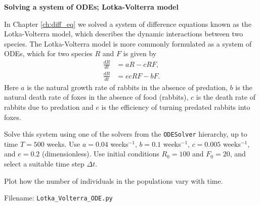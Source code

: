 \begin{Problem}{\textbf{Solving a system of ODEs; Lotka-Volterra model}}


  In Chapter \ref{ch:diff_eq} we solved a system of difference equations known
  as the Lotka-Volterra model, which describes the dynamic interactions between two
  species. The Lotka-Volterra model is more commonly formulated as a system of ODEs,
  which for two species $R$ and $F$ is given by
  \begin{align*}
  \frac{dR}{dt} &= aR - cRF, \\
  \frac{dR}{dt} &= ecRF - bF.
  \end{align*}
  Here $a$ is the natural growth rate of rabbits in the absence of predation, $b$ is
  the natural death rate of foxes in the absence of food (rabbits), $c$ is the death
  rate of rabbits due to predation and $e$ is the efficiency of turning
  predated rabbits into foxes.

  Solve this system using one of the solvers from the \texttt{ODESolver} hierarchy,
  up to time $T=500$ weeks. Use $a = 0.04$ weeks$^{-1}$, $b = 0.1$ weeks$^{-1}$,
  $c = 0.005$ weeks$^{-1}$, and $e = 0.2$ (dimensionless). Use initial conditions
  $R_0 = 100$ and $F_0 = 20$, and select a suitable time step $\Delta t$.

  Plot how the number of individuals in the populations
  vary with time.

Filename: \texttt{Lotka\_Volterra\_ODE.py}
\end{Problem}

